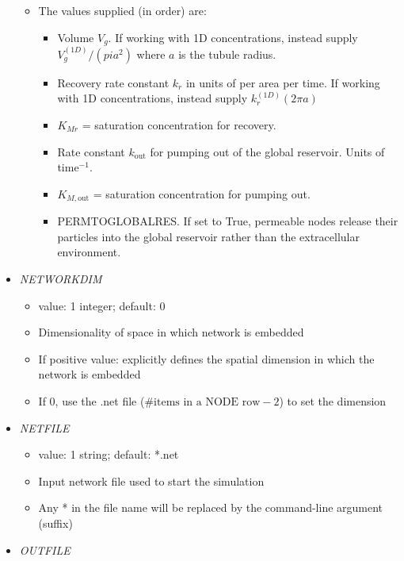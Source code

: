 \documentclass[12pt]{article}
\begin{document}
\begin{itemize}
\begin{itemize}
	\item The values supplied (in order) are:
	\begin{itemize}
		\item Volume $V_g$. If working with 1D concentrations, instead supply $V_g^{(1D)}/(pi a^2)$ where $a$ is the tubule radius.
		\item Recovery rate constant $k_r$ in units of per area per time. If working with 1D concentrations, instead supply $k_r^{(1D)} (2\pi a)$
		\item $K_{Mr}$ = saturation concentration for recovery. 
		\item Rate constant $k_\text{out}$ for pumping out of the global reservoir. Units of time$^{-1}$.
		\item $K_{M,\text{out}}$ = saturation concentration for pumping out.
		\item PERMTOGLOBALRES. If set to True, permeable nodes release their particles into the global reservoir rather than the extracellular environment.
	\end{itemize}
\end{itemize}
%
\item {\it NETWORKDIM}
	\begin{itemize}
		\item  value: 1 integer; default: 0
		\item Dimensionality of space in which network is embedded
		\item If positive value: explicitly defines the spatial dimension in which the network is embedded
		\item If 0, use the .net file ($\text{\# items in a NODE row} - 2$) to set the dimension
	\end{itemize}
%
\item {\it NETFILE}
\begin{itemize}
	\item  value: 1 string; default: *.net
	\item Input network file used to start the simulation
	 \item Any * in the file name will be replaced by the command-line argument (suffix)
\end{itemize}
%
\item {\it OUTFILE}
    \begin{itemize}

\end{itemize}
\end{itemize}
\end{document}
